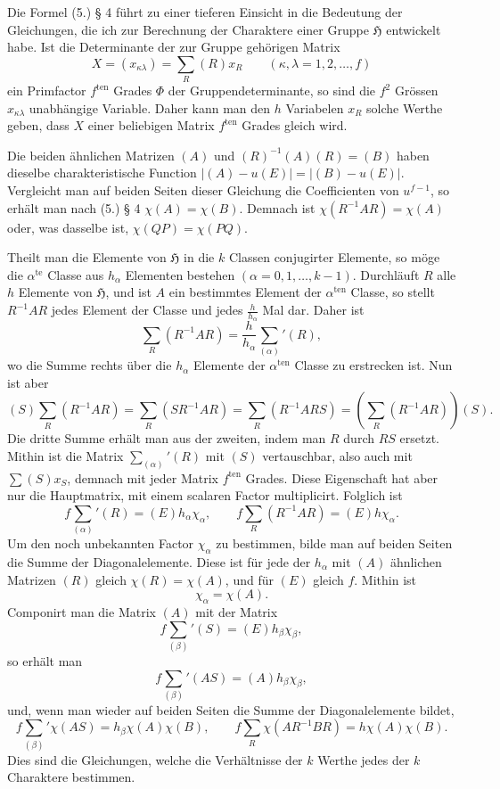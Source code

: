 \documentclass[11pt]{article}
\newcommand{\Hgrp}{\mathfrak{H}}
\newcommand{\ten}{\mathrm{ten}}
\newcommand{\te}{\mathrm{te}}
\begin{document}
Die Formel (5.) § 4 führt zu einer tieferen Einsicht in die Bedeutung der Gleichungen, die ich zur Berechnung der Charaktere einer Gruppe $\Hgrp$ entwickelt habe. Ist die Determinante der zur Gruppe gehörigen Matrix
\[
X=(x_{\kappa\lambda})=\sum_R(R)x_R\qquad(\kappa,\lambda=1,2,\ldots,f)
\]
ein Primfactor $f^{\ten}$ Grades $\Phi$ der Gruppendeterminante, so sind die $f^2$ Grössen $x_{\kappa\lambda}$ unabhängige Variable. Daher kann man den $h$ Variabelen $x_R$ solche Werthe geben, dass $X$ einer beliebigen Matrix $f^{\ten}$ Grades gleich wird.

Die beiden ähnlichen Matrizen $(A)$ und $(R)^{-1}(A)(R)=(B)$ haben dieselbe charakteristische Function $|(A)-u(E)|=|(B)-u(E)|$. Vergleicht man auf beiden Seiten dieser Gleichung die Coefficienten von $u^{f-1}$, so erhält man nach (5.) § 4 $\chi(A)=\chi(B)$. Demnach ist $\chi(R^{-1}AR)=\chi(A)$ oder, was dasselbe ist, $\chi(QP)=\chi(PQ)$.

Theilt man die Elemente von $\Hgrp$ in die $k$ Classen conjugirter Elemente, so möge die $\alpha^{\te}$ Classe aus $h_\alpha$ Elementen bestehen $(\alpha=0,1,\ldots,k-1)$. Durchläuft $R$ alle $h$ Elemente von $\Hgrp$, und ist $A$ ein bestimmtes Element der $\alpha^{\ten}$ Classe, so stellt $R^{-1}AR$ jedes Element der Classe und jedes $\frac{h}{h_\alpha}$ Mal dar. Daher ist
\[
\sum_R(R^{-1}AR)=\frac{h}{h_\alpha}\sum_{(\alpha)}'(R),
\]
wo die Summe rechts über die $h_\alpha$ Elemente der $\alpha^{\ten}$ Classe zu erstrecken ist. Nun ist aber
\[
(S)\sum_R(R^{-1}AR)=\sum_R(SR^{-1}AR)=\sum_R(R^{-1}ARS)=\left(\sum_R(R^{-1}AR)\right)(S).
\]
Die dritte Summe erhält man aus der zweiten, indem man $R$ durch $RS$ ersetzt. Mithin ist die Matrix $\sum_{(\alpha)}'(R)$ mit $(S)$ vertauschbar, also auch mit $\sum(S)x_S$, demnach mit jeder Matrix $f^{\ten}$ Grades. Diese Eigenschaft hat aber nur die Hauptmatrix, mit einem scalaren Factor multiplicirt. Folglich ist
\begin{equation}\tag{1.}
f\sum_{(\alpha)}'(R)=(E)h_\alpha\chi_\alpha,
\qquad
f\sum_R(R^{-1}AR)=(E)h\chi_\alpha.
\end{equation}
Um den noch unbekannten Factor $\chi_\alpha$ zu bestimmen, bilde man auf beiden Seiten die Summe der Diagonalelemente. Diese ist für jede der $h_\alpha$ mit $(A)$ ähnlichen Matrizen $(R)$ gleich $\chi(R)=\chi(A)$, und für $(E)$ gleich $f$. Mithin ist
\[
\chi_\alpha=\chi(A).
\]
Componirt man die Matrix $(A)$ mit der Matrix
\[
f\sum_{(\beta)}'(S)=(E)h_\beta\chi_\beta,
\]
so erhält man
\[
f\sum_{(\beta)}'(AS)=(A)h_\beta\chi_\beta,
\]
und, wenn man wieder auf beiden Seiten die Summe der Diagonalelemente bildet,
\begin{equation}\tag{2.}
f\sum_{(\beta)}'\chi(AS)=h_\beta\chi(A)\chi(B),
\qquad
f\sum_R\chi(AR^{-1}BR)=h\chi(A)\chi(B).
\end{equation}
Dies sind die Gleichungen, welche die Verhältnisse der $k$ Werthe jedes der $k$ Charaktere bestimmen.
\end{document}
